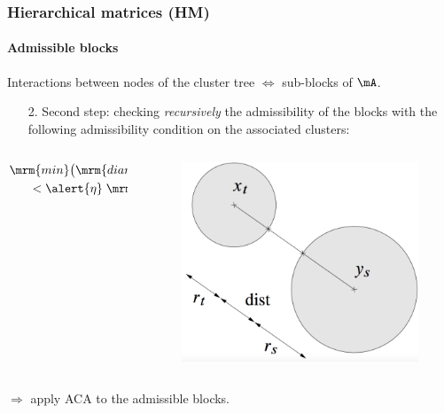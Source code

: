 \begin{frame}
\frametitle{Hierarchical matrices (HM)}
\framesubtitle{Admissible blocks }

\alert{Interactions between nodes} of the cluster tree $\Leftrightarrow$ \alert{sub-blocks} of $\mA$.

\medskip
\begin{itemize}
\item[2.] Second step: checking \emph{recursively} the admissibility of the blocks with the following \alert{admissibility condition} on the associated clusters:
\end{itemize}

\begin{columns}
\begin{column}{0.5\textwidth}
\begin{align*}
\mrm{min}\big( \mrm{diam}(\mB_{t}),\mrm{diam}(\mB_{s})\big) \\
< \alert{\eta}\;\mrm{dist}(\mrm{B}_{t},\mrm{B}_{s})
\end{align*}
\end{column}
\begin{column}{0.5\textwidth}
\begin{figure}
\includegraphics[width=0.9\columnwidth]{../images/cercles.png}
\end{figure}
\end{column}
\end{columns}

$\Rightarrow$ apply ACA to the admissible blocks.

\end{frame}

